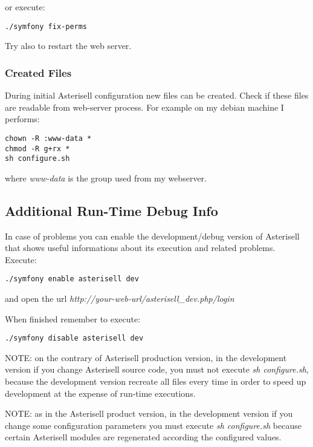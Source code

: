\documentclass[letterpaper,10pt,english]{sphinxmanual}
\begin{document}
or execute:

\begin{Verbatim}[commandchars=@\[\]]
./symfony fix-perms
\end{Verbatim}

Try also to restart the web server.


\subsubsection{Created Files}
\label{index:created-files}
During initial Asterisell configuration new files can be created. Check if these files are readable from web-server process. For example on my debian machine I performs:

\begin{Verbatim}[commandchars=@\[\]]
chown -R :www-data *
chmod -R g+rx *
sh configure.sh
\end{Verbatim}

where \emph{www-data} is the group used from my webserver.


\subsection{Additional Run-Time Debug Info}
\label{index:additional-run-time-debug-info}
In case of problems you can enable the development/debug version of Asterisell that shows useful informations about its execution and related problems. Execute:

\begin{Verbatim}[commandchars=@\[\]]
./symfony enable asterisell dev
\end{Verbatim}

and open the url \emph{http://your-web-url/asterisell\_dev.php/login}

When finished remember to execute:

\begin{Verbatim}[commandchars=@\[\]]
./symfony disable asterisell dev
\end{Verbatim}

NOTE: on the contrary of Asterisell production version, in the development version if you change Asterisell source code, you must not execute \emph{sh configure.sh}, because the development version recreate all files every time in order to speed up development at the expense of run-time executions.

NOTE: as in the Asterisell product version, in the development version if you change some configuration parameters you must execute \emph{sh configure.sh} because certain Asterisell modules are regenerated according the configured values.
\end{document}
